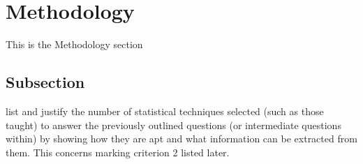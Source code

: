 \section{Methodology}\label{Section label}
This is the Methodology section
\subsection{Subsection}\label{subsection}
list and justify the number of statistical techniques selected (such as those taught) to answer the previously outlined questions (or intermediate questions within) by showing how they are apt and what information can be extracted from them. This concerns marking criterion 2 listed later. 